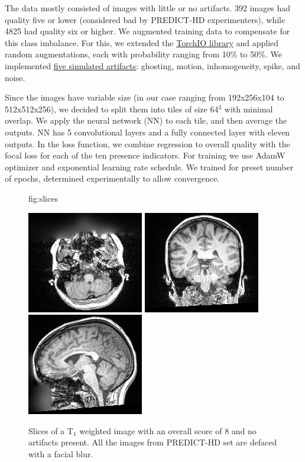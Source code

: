 \documentclass{midl} %
\begin{document}
The data mostly consisted of images with little or no artifacts. 392 images had quality five or lower (considered bad by PREDICT-HD experimenters), while 4825 had quality six or higher. We augmented training data to compensate for this class imbalance. For this, we extended the \href{https://torchio.readthedocs.io/transforms/augmentation.html}{TorchIO library} and applied random augmentations, each with probability ranging from 10\% to 50\%. We implemented \href{https://github.com/OpenImaging/miqa/pull/339}{five simulated artifacts}: ghosting, motion, inhomogeneity, spike, and noise.

Since the images have variable size (in our case ranging from 192x256x104 to 512x512x256), we decided to split them into tiles of size 64$^3$ with minimal overlap. We apply the neural network (NN) to each tile, and then average the outputs. NN has 5 convolutional layers and a fully connected layer with eleven outputs. In the loss function, we combine regression to overall quality with the focal loss for each of the ten presence indicators. For training we use AdamW optimizer and exponential learning rate schedule. We trained for preset number of epochs, determined experimentally to allow convergence.


\begin{figure}[htbp]
\floatconts
  {fig:slices} %
  {\caption{Slices of a T$_1$ weighted image with an overall score of 8 and no artifacts present. All the images from PREDICT-HD set are defaced with a facial blur.}}
  {
  \includegraphics[width=0.32\linewidth]{axial.png}
  \includegraphics[width=0.32\linewidth]{coronal.png}
  \includegraphics[width=0.32\linewidth]{sagittal.png}
  }
\end{figure}
\end{document}
